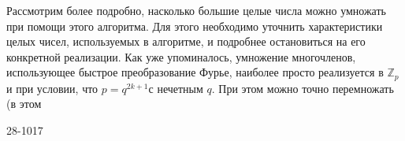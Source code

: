 \par
Рассмотрим более подробно, насколько большие целые числа можно\linebreak
умножать при помощи этого алгоритма. Для этого необходимо \linebreak
уточнить характеристики целых чисел, используемых в алгоритме, и \linebreak
подробнее остановиться на его конкретной реализации. Как уже \linebreak
упоминалось, умножение многочленов, использующее быстрое \linebreak
преобразование Фурье, наиболее просто реализуется в $\mathbb{Z}_p$ и при условии, что $p = q^{2k+1}$с нечетным $q$. При этом можно точно перемножать (в этом\linebreak 
\begin{flushleft}
\tiny
28-1017
\end{flushleft}
\pagebreak
\newpage


